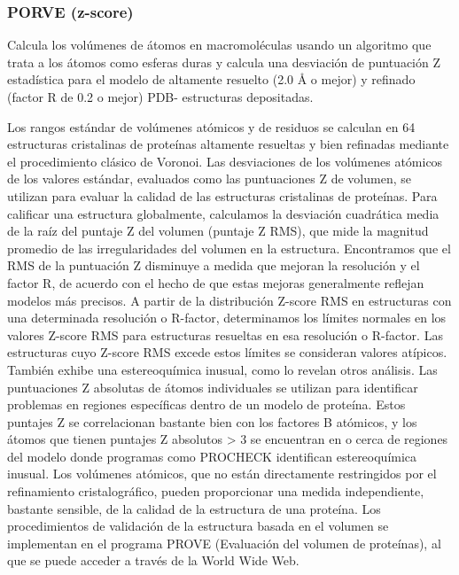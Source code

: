\documentclass[11pt, letterpaper, spanish]{article}
\begin{document}
{{{\subsubsection{PORVE (z-score)}
\par{Calcula los volúmenes de átomos en macromoléculas usando un algoritmo que trata a los átomos como esferas duras y calcula una desviación de puntuación Z estadística para el modelo de altamente resuelto (2.0 Å o mejor) y refinado (factor R de 0.2 o mejor) PDB- estructuras depositadas.}
\par{Los rangos estándar de volúmenes atómicos y de residuos se calculan en 64 estructuras cristalinas de proteínas altamente resueltas y bien refinadas mediante el procedimiento clásico de Voronoi. Las desviaciones de los volúmenes atómicos de los valores estándar, evaluados como las puntuaciones Z de volumen, se utilizan para evaluar la calidad de las estructuras cristalinas de proteínas. Para calificar una estructura globalmente, calculamos la desviación cuadrática media de la raíz del puntaje Z del volumen (puntaje Z RMS), que mide la magnitud promedio de las irregularidades del volumen en la estructura. Encontramos que el RMS de la puntuación Z disminuye a medida que mejoran la resolución y el factor R, de acuerdo con el hecho de que estas mejoras generalmente reflejan modelos más precisos. A partir de la distribución Z-score RMS en estructuras con una determinada resolución o R-factor, determinamos los límites normales en los valores Z-score RMS para estructuras resueltas en esa resolución o R-factor. Las estructuras cuyo Z-score RMS excede estos límites se consideran valores atípicos. También exhibe una estereoquímica inusual, como lo revelan otros análisis. Las puntuaciones Z absolutas de átomos individuales se utilizan para identificar problemas en regiones específicas dentro de un modelo de proteína. Estos puntajes Z se correlacionan bastante bien con los factores B atómicos, y los átomos que tienen puntajes Z absolutos > 3 se encuentran en o cerca de regiones del modelo donde programas como PROCHECK identifican estereoquímica inusual. Los volúmenes atómicos, que no están directamente restringidos por el refinamiento cristalográfico, pueden proporcionar una medida independiente, bastante sensible, de la calidad de la estructura de una proteína. Los procedimientos de validación de la estructura basada en el volumen se implementan en el programa PROVE (Evaluación del volumen de proteínas), al que se puede acceder a través de la World Wide Web.}

}}}
\end{document}
